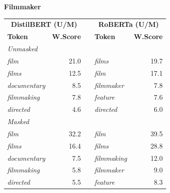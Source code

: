 \documentclass[11pt]{article}
\begin{document}
\vspace{4pt}\noindent\textbf{Filmmaker}
\begin{center}\scriptsize
\begin{tabular}{lrllr}
\toprule
\multicolumn{2}{c}{\textbf{DistilBERT (U/M)}} & & \multicolumn{2}{c}{\textbf{RoBERTa (U/M)}} \\
\textbf{Token} & \textbf{W.Score} & & \textbf{Token} & \textbf{W.Score} \\
\midrule
\multicolumn{5}{l}{\textit{Unmasked}} \\
\emph{film} & 21.0 & & \emph{films} & 19.7 \\
\emph{films} & 12.5 & & \emph{film} & 17.1 \\
\emph{documentary} & 8.5 & & \emph{filmmaker} & 7.8 \\
\emph{filmmaking} & 7.8 & & \emph{feature} & 7.6 \\
\emph{directed} & 4.6 & & \emph{directed} & 6.0 \\
\multicolumn{5}{l}{\textit{Masked}} \\
\emph{film} & 32.2 & & \emph{film} & 39.5 \\
\emph{films} & 16.4 & & \emph{films} & 28.8 \\
\emph{documentary} & 7.5 & & \emph{filmmaking} & 12.0 \\
\emph{filmmaking} & 5.8 & & \emph{filmmaker} & 9.0 \\
\emph{directed} & 5.5 & & \emph{feature} & 8.3 \\
\bottomrule
\end{tabular}
\end{center}
\end{document}

